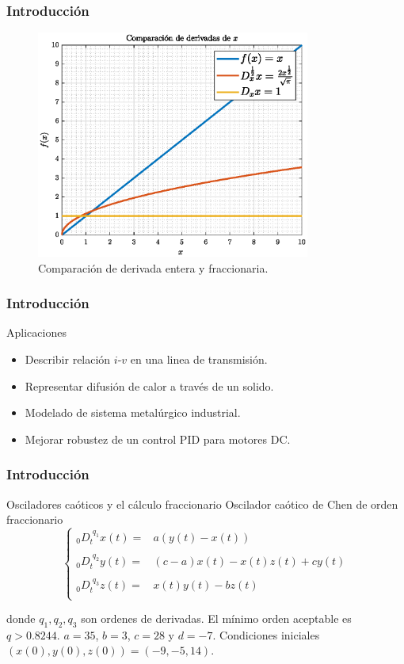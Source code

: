 \documentclass[10pt]{beamer}
\begin{document}
	\begin{frame}
		\frametitle{Introducción}
	
		\begin{figure}[hbtp]
			\centering
			\includegraphics[width = 9cm]{A3_derivada_x.eps}
			\caption{Comparación de derivada entera y fraccionaria.}
		\end{figure}
	\end{frame}	
	
	\begin{frame}
		\frametitle{Introducción}
		\begin{block}{Aplicaciones}
			\begin{itemize}
			\justifying
				\item Describir relación $i$-$v$ en una linea de transmisión.
				\item Representar difusión de calor a través de un solido.
				\item Modelado de sistema metalúrgico industrial.
				\item Mejorar robustez de un control PID para motores DC.
			\end{itemize}
		\end{block}
			
	\end{frame}	
	
	\begin{frame}
		\frametitle{Introducción}
		\begin{block}{Osciladores caóticos y el cálculo fraccionario}
		\justifying
		Oscilador caótico de Chen de orden fraccionario
		\[\left\{ \begin{array}{rl}
		 	_{0} D_{t}^{\,\,q_{1}} x(t)= & a (y(t) - x(t)) \\
		 	&\\
			_{0} D_{t}^{\,\,q_{2}} y(t)= & (c - a) x(t) - x(t) z(t) + cy(t) \\
			&\\
			_{0} D_{t}^{\,\,q_{3}} z(t)= &  x(t) y(t) - b z(t)\\
		\end{array}
		\right. \]
		
		donde $q_{1}, q_{2}, q_{3}$ son ordenes de derivadas. El mínimo orden aceptable es $q > 0.8244$. $a = 35$, $b = 3$, $c = 28$ y $d = -7$. Condiciones iniciales $(x(0), y(0), z(0)) = (-9,-5,14)$.
		\end{block}
	\end{frame}	
	
\end{document}
